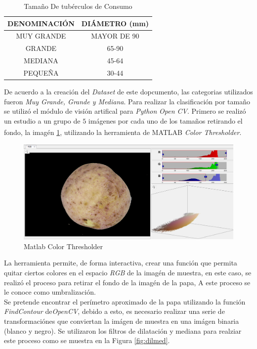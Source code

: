 	\begin{table}[ht]
		\centering
		\begin{tabular}{|c|c|}
			\hline
			DENOMINACIÓN & DIÁMETRO (mm) \\
			\hline
			MUY GRANDE & MAYOR DE 90 \\
			\hline
			GRANDE & 65-90 \\
			\hline
			MEDIANA	& 45-64 \\
			\hline
			PEQUEÑA & 30-44 \\
			\hline
		\end{tabular}	
		\caption{Tamaño De tubérculos de Consumo}
		\label{table:limites}
	\end{table}	
	
	De acuerdo a la creación del \textit{Dataset} de este dopcumento, las categorias utilizados fueron \textit{Muy Grande, Grande y Mediana}. Para realizar la clasificación por tamaño se utilizó el módulo de visión artifical para \textit{Python} \textit{Open CV}. Primero se realizó un estudio a un grupo de $5$ imágenes por cada uno de los tamaños retirando el fondo, la imagén \ref{fig:matlabcv}, utilizando la herramienta de MATLAB\textsuperscript{\textregistered} \textit{Color Thresholder}.
	
				
	\begin{figure}[ht]
		\centering
		\includegraphics[scale=0.3]{Figs/matlabcv.png}
		\caption{Matlab Color Thresholder}
		\label{fig:matlabcv}
	\end{figure}
	
	La herramienta permite, de forma interactiva, crear una función que permita quitar ciertos colores en el espacio \textit{RGB} de la imagén de muestra, en este caso, se realizó el proceso para retirar el fondo de la imagén de la papa, A este proceso se le conoce como umbralización. \\
	
	Se pretende encontrar el perímetro aproximado de la papa utilizando la función \textit{FindContour} de\textit{OpenCV}, debido a esto, es necesario realizar una serie de transformaciónes que conviertan la imágen de muestra en una imágen binaria (blanco y negro). Se utilizaron los filtros de dilatación y mediana para realziar este proceso como se muestra en la Figura \ref{fig:dilmed}.	
					
